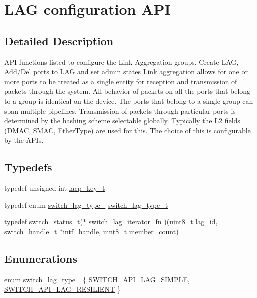 \hypertarget{group__LAG}{\section{L\+A\+G configuration A\+P\+I}
\label{group__LAG}
}


\subsection{Detailed Description}
A\+P\+I functions listed to configure the Link Aggregation groups. Create L\+A\+G, Add/\+Del ports to L\+A\+G and set admin states Link aggregation allows for one or more ports to be treated as a single entity for reception and transmission of packets through the system. All behavior of packets on all the ports that belong to a group is identical on the device. The ports that belong to a single group can span multiple pipelines. Transmission of packets through particular ports is determined by the hashing scheme selectable globally. Typically the L2 fields (D\+M\+A\+C, S\+M\+A\+C, Ether\+Type) are used for this. The choice of this is configurable by the A\+P\+Is. \subsection*{Typedefs}
\begin{DoxyCompactItemize}
\item 
typedef unsigned int \hyperlink{group__LAG_ga725a51213e81fbcf7d83552dd183dc1c}{lacp\+\_\+key\+\_\+t}
\item 
typedef enum \hyperlink{group__LAG_ga27f33bc168b263c99fcece54e4f3c222}{switch\+\_\+lag\+\_\+type\+\_\+} \hyperlink{group__LAG_ga6090687f6492ca949c72c5929fd58dfe}{switch\+\_\+lag\+\_\+type\+\_\+t}
\item 
typedef switch\+\_\+status\+\_\+t($\ast$ \hyperlink{group__LAG_ga9ed343b0cd5c8838c1143ac2a41f1751}{switch\+\_\+lag\+\_\+iterator\+\_\+fn} )(uint8\+\_\+t lag\+\_\+id, switch\+\_\+handle\+\_\+t $\ast$intf\+\_\+handle, uint8\+\_\+t member\+\_\+count)
\end{DoxyCompactItemize}
\subsection*{Enumerations}
\begin{DoxyCompactItemize}
\item 
enum \hyperlink{group__LAG_ga27f33bc168b263c99fcece54e4f3c222}{switch\+\_\+lag\+\_\+type\+\_\+} \{ \hyperlink{group__LAG_gga27f33bc168b263c99fcece54e4f3c222a8520ce309a828bd9e867b11ede67e4c0}{S\+W\+I\+T\+C\+H\+\_\+\+A\+P\+I\+\_\+\+L\+A\+G\+\_\+\+S\+I\+M\+P\+L\+E}, 
\hyperlink{group__LAG_gga27f33bc168b263c99fcece54e4f3c222a24adf52cd43544c8fcf521b208a690ae}{S\+W\+I\+T\+C\+H\+\_\+\+A\+P\+I\+\_\+\+L\+A\+G\+\_\+\+R\+E\+S\+I\+L\+I\+E\+N\+T}
 \}
\end{DoxyCompactItemize}
